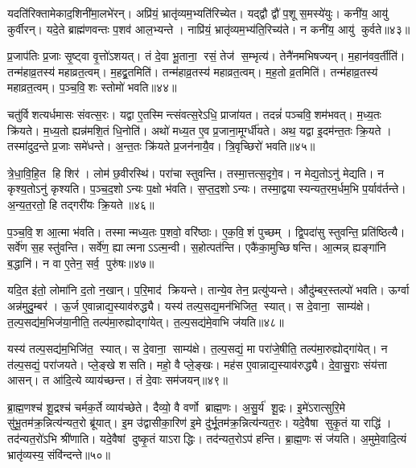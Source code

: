यदति॑रिक्तामेकाद॒शिनी॑मा॒लभे॑रन्।
अप्रि॑यं॒ भ्रातृ॑व्यम॒भ्यति॑\-रिच्येत।
यद्द्वौ द्वौ॑ प॒शू स॒मस्ये॑युः।
कनी॑य॒ आयु॑ कुर्वीरन्।
यदे॒ते ब्राह्म॑णवन्तः प॒शव॑ आल॒भ्यन्ते।
नाप्रि॑यं॒ भ्रातृ॑व्यम॒भ्य॑ति॒रिच्य॑ते।
न कनी॑य॒ आयु॑ कुर्वते॥४३॥\anuvakamend[ते ए॒वाल॑भन्ते मैत्रावरु॒णीमाल॑भ॒न्तेऽव॑रुद्ध्यै स॒प्त च॑]

प्र॒जाप॑तिः प्र॒जाः सृ॒ष्ट्वा वृ॒त्तो॑ऽशयत्।
तं दे॒वा भू॒ताना॒ रसं॒ तेज॑ स॒म्भृत्य॑।
तेनै॑नमभिषज्यन्।
म॒हान॑वव॒र्तीति॑।
तन्म॑हाव्र॒तस्य॑ महाव्रत॒त्वम्।
म॒हद्व्र॒तमिति॑।
तन्म॑हाव्र॒तस्य॑ महाव्रत॒त्वम्।
म॒ह॒तो व्र॒तमिति॑।
तन्म॑हाव्र॒तस्य॑ महाव्रत॒त्वम्।
प॒ञ्च॒वि॒शः स्तोमो॑ भवति॥४४॥

चतु॑र्विशत्यर्धमासः संवत्स॒रः।
यद्वा ए॒तस्मिन्त्संवत्स॒रेऽधि॒ प्राजा॑यत।
तदन्नं॑ पञ्चवि॒शम॑भवत्।
म॒ध्य॒तः क्रि॑यते।
म॒ध्य॒तो ह्यन्न॑मशि॒तं धि॒नोति॑।
अथो॑ मध्य॒त ए॒व प्र॒जाना॒मूर्ग्धी॑यते।
अथ॒ यद्वा इ॒दम॑न्त॒तः क्रि॒यते।
तस्मा॑दुद॒न्ते प्र॒जाः समे॑धन्ते।
अ॒न्त॒तः क्रि॑यते प्र॒जन॑नायै॒व।
त्रि॒वृच्छिरो॑ भवति॥४५॥

त्रे॒धा॒वि॒हि॒त हि शिर॑।
लोम॑ छ॒वीरस्थि॑।
परा॑चा स्तुवन्ति।
तस्मा॒त्तत्स॒दृगे॒व।
न मेद्य॒तोऽनु॑ मेद्यति।
न कृश्य॒तोऽनु॑ कृश्यति।
प॒ञ्च॒द॒शोऽन्यः प॒क्षो भ॑वति।
स॒प्त॒द॒शोऽन्यः।
तस्मा॒द्वयास्यन्यत॒रम॒र्धम॒भि प॒र्याव॑र्तन्ते।
अ॒न्य॒त॒रतो॒ हि तद्गरी॑यः क्रि॒यते॥४६॥

प॒ञ्च॒वि॒श आ॒त्मा भ॑वति।
तस्मान्मध्य॒तः प॒शवो॒ वरि॑ष्ठाः।
ए॒क॒वि॒शं पुच्छम्।
द्वि॒पदा॑सु स्तुवन्ति॒ प्रति॑ष्ठित्यै।
सर्वे॑ण स॒ह स्तु॑वन्ति।
सर्वे॑ण॒ ह्यात्मनाऽऽत्म॒न्वी।
स॒होत्पत॑न्ति।
एकै॑का॒मुच्छिषन्ति।
आ॒त्मन्न् ह्यङ्गा॑नि ब॒द्धानि॑।
न वा ए॒तेन॒ सर्व॒ पुरु॑षः॥४७॥

यदि॒त इ॑तो॒ लोमा॑नि द॒तो न॒खान्।
प॒रि॒माद॑ क्रियन्ते।
तान्ये॒व तेन॒ प्रत्यु॑प्यन्ते।
औदु॑म्बर॒स्तल्पो॑ भवति।
ऊर्ग्वा अन्न॑मुदु॒म्बर॑।
ऊ॒र्ज ए॒वान्नाद्य॒स्याव॑रुद्ध्यै।
यस्य॑ तल्प॒सद्य॒मन॑भिजित॒ स्यात्।
स दे॒वाना॒ साम्य॑क्षे।
त॒ल्प॒सद्य॑म॒भिज॑या॒नीति॒ तल्प॑मा॒रुह्योद्गा॑येत्।
त॒ल्प॒सद्य॑मे॒वाभि ज॑यति॥४८॥

यस्य॑ तल्प॒सद्य॑म॒भिजि॑त॒ स्यात्।
स दे॒वाना॒ साम्य॑क्षे।
त॒ल्प॒सद्यं॒ मा परा॑जे॒षीति॒ तल्प॑मा॒रुह्योद्गा॑येत्।
न त॑ल्प॒सद्यं॒ परा॑जयते।
प्ले॒ङ्खे शसति।
महो॒ वै प्ले॒ङ्खः।
मह॑स ए॒वान्नाद्य॒स्याव॑रुद्ध्यै।
दे॒वा॒सु॒राः संय॑त्ता आसन्।
त आ॑दि॒त्ये व्याय॑च्छन्त।
तं दे॒वाः सम॑जयन्॥४९॥

ब्रा॒ह्म॒णश्च॑ शू॒द्रश्च॑ चर्मक॒र्ते व्याय॑च्छेते।
दैव्यो॒ वै वर्णो ब्राह्म॒णः।
अ॒सु॒र्य॑ शू॒द्रः।
इ॒मे॑ऽरात्सुरि॒मे सु॑भू॒तम॑क्र॒न्नित्य॑न्यत॒रो ब्रू॑यात्।
इ॒म उ॑द्वासीका॒रिण॑ इ॒मे दु॑र्भू॒तम॑क्र॒न्नित्य॑न्यत॒रः।
यदे॒वैषा सुकृ॒तं या राद्धि॑।
तद॑न्यत॒रो॑ऽभि श्री॑णाति।
यदे॒वैषां दुष्कृ॒तं याऽराद्धिः।
तद॑न्यत॒रोऽप॑ हन्ति।
ब्रा॒ह्म॒णः सं ज॑यति।
अ॒मुमे॒वादि॒त्यं भ्रातृ॑व्यस्य॒ संवि॑न्दन्ते॥५०॥




